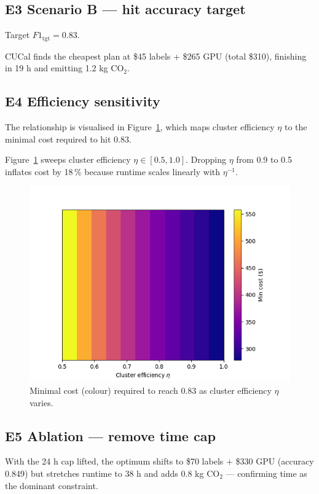 \documentclass[11pt]{article}
\begin{document}
\subsection{E3 Scenario B — hit accuracy target}
Target \(F1_\text{tgt}=0.83\).

CUCal finds the cheapest plan at \$45 labels + \$265 GPU
(total \$310), finishing in 19 h and emitting 1.2 kg CO\(_2\).

\subsection{E4 Efficiency sensitivity}

The relationship is visualised in Figure~\ref{fig:heatmap}, which maps
cluster efficiency $\eta$ to the minimal cost required to hit
\SI{0.83}{\fOneScore}.

Figure~\ref{fig:heatmap} sweeps cluster efficiency
\(\eta\in[0.5,1.0]\).  
Dropping \(\eta\) from 0.9 to 0.5 inflates cost by 18\,\% because
runtime scales linearly with $\eta^{-1}$.

\begin{figure}[htbp]
  \centering
  \includegraphics[width=.78\linewidth]{figures/heatmap_eff.png}
  \caption{Minimal cost (colour) required to reach \SI{0.83}{\fOneScore} as cluster efficiency $\eta$ varies.}
  \label{fig:heatmap}
\end{figure}

\subsection{E5 Ablation — remove time cap}
With the 24 h cap lifted, the optimum shifts to
\$70 labels + \$330 GPU (accuracy 0.849) but stretches runtime
to 38 h and adds 0.8 kg CO\(_2\) — confirming time as the
dominant constraint.
\end{document}
